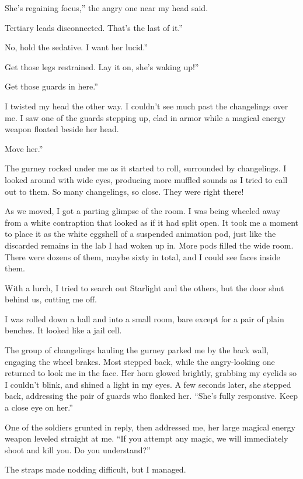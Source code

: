 \leavevmode{}She’s regaining focus,” the angry one near my head said.

\leavevmode{}Tertiary leads disconnected. That’s the last of it.”

\leavevmode{}No, hold the sedative. I want her lucid.”

\leavevmode{}Get those legs restrained. Lay it on, she’s waking up!”

\leavevmode{}Get those guards in here.”

I twisted my head the other way. I couldn’t see much past the changelings over me. I saw one of the guards stepping up, clad in armor while a magical energy weapon floated beside her head.

\leavevmode{}Move her.”

The gurney rocked under me as it started to roll, surrounded by changelings. I looked around with wide eyes, producing more muffled sounds as I tried to call out to them. So many changelings, so close. They were right there!

As we moved, I got a parting glimpse of the room. I was being wheeled away from a white contraption that looked as if it had split open. It took me a moment to place it as the white eggshell of a suspended animation pod, just like the discarded remains in the lab I had woken up in. More pods filled the wide room. There were dozens of them, maybe sixty in total, and I could see faces inside them.

With a lurch, I tried to search out Starlight and the others, but the door shut behind us, cutting me off.

I was rolled down a hall and into a small room, bare except for a pair of plain benches. It looked like a jail cell.

The group of changelings hauling the gurney parked me by the back wall, engaging the wheel brakes. Most stepped back, while the angry-looking one returned to look me in the face. Her horn glowed brightly, grabbing my eyelids so I couldn’t blink, and shined a light in my eyes. A few seconds later, she stepped back, addressing the pair of guards who flanked her. “She’s fully responsive. Keep a close eye on her.”

One of the soldiers grunted in reply, then addressed me, her large magical energy weapon leveled straight at me. “If you attempt any magic, we will immediately shoot and kill you. Do you understand?”

The straps made nodding difficult, but I managed.

